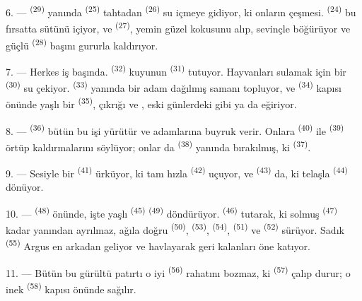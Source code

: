 6. ---  \textsuperscript{(29)} yanında 
\textsuperscript{(25)} tahtadan  \textsuperscript{(26)} su
içmeye gidiyor, ki onların çeşmesi. 
\textsuperscript{(24)} bu fırsatta sütünü içiyor, ve 
\textsuperscript{(27)}, yemin güzel kokusunu alıp, sevinçle böğürüyor ve güçlü
 \textsuperscript{(28)} başını gururla kaldırıyor.

7. --- Herkes iş başında.  \textsuperscript{(32)}
kuyunun  \textsuperscript{(31)} tutuyor. Hayvanları sulamak için
bir  \textsuperscript{(30)} su çekiyor. 
\textsuperscript{(33)} yanında bir adam dağılmış samanı topluyor, ve
 \textsuperscript{(34)} kapısı önünde yaşlı bir
 \textsuperscript{(35)}, çıkrığı ve ,
eski günlerdeki gibi  ya da  eğiriyor.

\VUsaut{3.0mm}
\VUsaut{3.0mm}

8. ---  \textsuperscript{(36)} bütün bu işi yürütür ve
adamlarına buyruk verir. Onlara  \textsuperscript{(40)} ile
 \textsuperscript{(39)} örtüp kaldırmalarını söylüyor; onlar da
 \textsuperscript{(38)} yanında bırakılmış, ki
 \textsuperscript{(37)}.

9. --- Sesiyle bir  \textsuperscript{(41)} ürküyor, ki tam
hızla  \textsuperscript{(42)} uçuyor, ve
 \textsuperscript{(43)} da, ki telaşla 
\textsuperscript{(44)} dönüyor.

10. ---  \textsuperscript{(48)} önünde, işte yaşlı
 \textsuperscript{(45)}  \textsuperscript{(49)}
döndürüyor.  \textsuperscript{(46)} tutarak, ki solmuş
 \textsuperscript{(47)} kadar yanından ayrılmaz, ağıla doğru
 \textsuperscript{(50)}, 
\textsuperscript{(53)},  \textsuperscript{(54)},
 \textsuperscript{(51)} ve 
\textsuperscript{(52)} sürüyor. Sadık  \textsuperscript{(55)}
Argus en arkadan geliyor ve havlayarak geri kalanları öne katıyor.

11. --- Bütün bu gürültü patırtı o iyi 
\textsuperscript{(56)} rahatını bozmaz, ki 
\textsuperscript{(57)} çalıp durur; o inek 
\textsuperscript{(58)} kapısı önünde sağılır.

